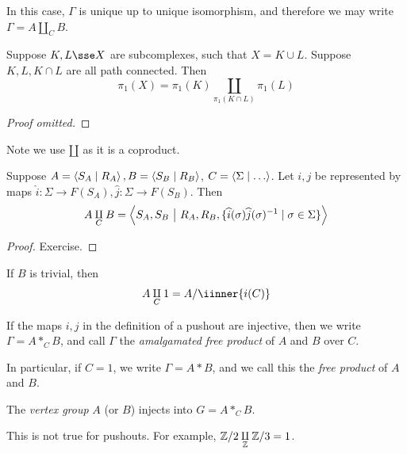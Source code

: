 \documentclass{article}
\begin{document}
In this case, \(\Gamma\) is unique up to unique isomorphism, and therefore we may write \(\Gamma = A \underset{C}{\amalg} B\).

\begin{theorem}
     Suppose \(K, L \sse X\) are subcomplexes, such that \(X = K \cup L\). Suppose \(K, L, K \cap L\) are all path connected. Then
    \[\pi_1(X) = \pi_1(K) \underset{\pi_1(K \cap L)}{\amalg} \pi_1(L)\]
\end{theorem}

\begin{proof}
    [Proof omitted]
\end{proof}

Note we use \(\amalg\) as it is a coproduct.

\begin{proposition}
    Suppose \(A = \left\langle S_A \mid R_A \right\rangle, B = \left\langle S_B \mid R_B \right\rangle\), \(C = \inner{\Sigma \mid \dots}\). Let \(i, j\) be represented by maps \(\widehat i : \Sigma \to F(S_A), \widehat j : \Sigma \to F(S_B)\). Then
    \[A \underset{C}{\amalg} B = \left\langle S_A, S_B \ \big\vert\ R_A, R_B, \{\widehat i(\sigma)\widehat j(\sigma)^{-1} \mid \sigma \in \Sigma\} \right\rangle\]
\end{proposition}

\begin{proof}
    Exercise.
\end{proof}

\begin{example}
    If \(B\) is trivial, then
    \[A \underset{C}{\amalg} 1 = A/\iinner{i(C)}\]
\end{example}

\begin{definition}
    If the maps \(i, j\) in the definition of a pushout are injective, then we write \(\Gamma = A *_C B\), and call \(\Gamma\) the \emph{amalgamated free product} of \(A\) and \(B\) over \(C\).

    In particular, if \(C = 1\), we write \(\Gamma = A * B\), and we call this the \emph{free product} of \(A\) and \(B\).
\end{definition}

\begin{theorem}
     The \emph{vertex group} \(A\) (or \(B\)) injects into \(G = A *_C B\).
\end{theorem}

\begin{remark}
    This is not true for pushouts. For example, \(\mathbb{Z}/2 \underset{\mathbb{Z}}\amalg \mathbb{Z}/3 = 1\).
\end{remark}
\end{document}
